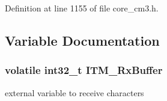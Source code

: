 \-Definition at line 1155 of file core\-\_\-cm3.\-h.



\subsection{\-Variable \-Documentation}
\hypertarget{group___c_m_s_i_s__core___debug_functions_ga12e68e55a7badc271b948d6c7230b2a8}{
\subsubsection[{\-I\-T\-M\-\_\-\-Rx\-Buffer}]{\setlength{\rightskip}{0pt plus 5cm}volatile int32\-\_\-t {\bf \-I\-T\-M\-\_\-\-Rx\-Buffer}}}\label{group___c_m_s_i_s__core___debug_functions_ga12e68e55a7badc271b948d6c7230b2a8}
external variable to receive characters 